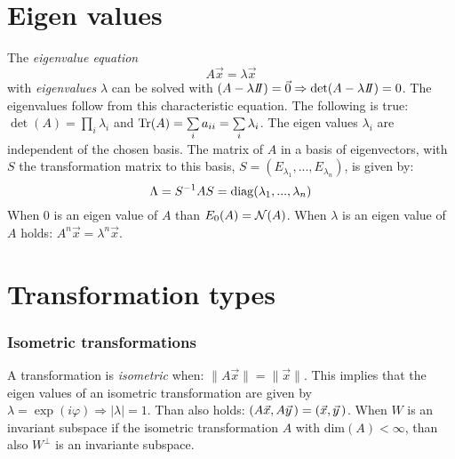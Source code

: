 \documentclass[a4paper,fancyheadings,twoside]{report}
\begin{document}
\section{Eigen values}
The {\it eigenvalue equation}
\[
A\vec{x}=\lambda\vec{x}
\]
with {\it eigenvalues} $\lambda$ can be solved with
$(A-\lambda I\hspace{-1mm}I)=\vec{0}\Rightarrow\det(A-\lambda I\hspace{-1mm}I)=0$. The eigenvalues
follow from this characteristic equation. The following is true:
$\det(A)=\prod\limits_i\lambda_i$ and
${\rm Tr}(A)=\sum\limits_ia_{ii}=\sum\limits_i\lambda_i$.
\npar
The eigen values $\lambda_i$ are independent of the chosen basis.
The matrix of $A$ in a basis of eigenvectors, with $S$ the transformation matrix
to this basis, $S=(E_{\lambda_1},...,E_{\lambda_n})$, is given by:
\[
\Lambda=S^{-1}AS={\rm diag}(\lambda_1,...,\lambda_n)
\]
When 0 is an eigen value of $A$ than $E_0(A)={\cal N}(A)$.
\npar
When $\lambda$ is an eigen value of $A$ holds: $A^n\vec{x}=\lambda^n\vec{x}$.

\section{Transformation types}
\subsubsection{Isometric transformations}
A transformation is {\it isometric} when: $\|A\vec{x}\|=\|\vec{x}\|$. This
implies that the eigen values of an isometric transformation are given by
$\lambda=\exp(i\varphi)\Rightarrow|\lambda|=1$. Than also holds:
$(A\vec{x},A\vec{y}\,)=(\vec{x},\vec{y}\,)$.
\npar
When $W$ is an invariant subspace if the isometric transformation $A$ with
dim$(A)<\infty$, than also $W^\perp$ is an invariante subspace.
\end{document}
